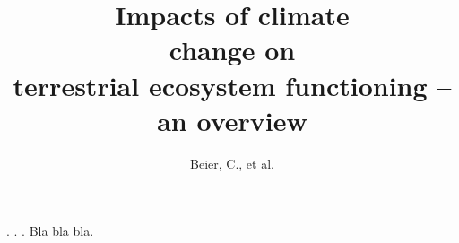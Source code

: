 \documentclass[titlepage, a4paper, twoside, justified, nobib]{tufte-book}
\title{Impacts of climate\\change on\\terrestrial ecosystem functioning --\\an   overview}
\author{Beier, C., et al.}
\begin{document}
.
.
.
Bla bla \citep{Pilegaard2014} bla.

\end{document}
